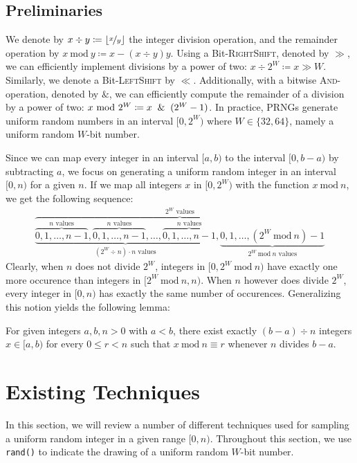 \documentclass[a4paper, UKenglish, cleveref, autoref, thm-restate]{lipics-v2021}
\newcommand{\Mod}[1]{\ \mathrm{mod}\ #1}
\begin{document}
\subsection{Preliminaries}\label{sec:1.2}
We denote by $x \div y \coloneqq \lfloor\nicefrac{x}{y}\rfloor$ the integer division operation, and the remainder operation by $x \Mod y \coloneqq x - (x \div y)y$. 
Using a Bit-\textsc{RightShift}, denoted by $\gg$, we can efficiently implement divisions by a power of two: $x \div 2^W \coloneqq x \gg W$.
Similarly, we denote a Bit-\textsc{LeftShift} by $\ll$.
Additionally, with a bitwise \textsc{And}-operation, denoted by $\&$, we can efficiently compute the remainder of a division by a power of two: $x \Mod 2^W \coloneqq x \And (2^W - 1)$.
In practice, PRNGs generate uniform random numbers in an interval $[0,2^W)$ where $W \in \{32,64\}$, namely a uniform random $W$-bit number.

Since we can map every integer in an interval $[a,b)$ to the interval $[0,b - a)$ by subtracting $a$, we focus on generating a uniform random integer in an interval $[0,n)$ for a given $n$.
If we map all integers $x$ in $[0,2^W)$ with the function $x \Mod n$, we get the following sequence:
{\large
\begin{align}\label{eq:1}
    \overbrace{\underbrace{\overbrace{0,1,\ldots,n - 1}^{\text{$n$ values}},\overbrace{0,1,\ldots,n - 1}^{\text{$n$ values}},\ldots,\overbrace{0,1,\ldots,n - 1}^{\text{$n$ values}}}_{\text{$\left(2^W \div n\right) \cdot n$ values}},\underbrace{0,1,\ldots,\left(2^W \Mod n\right) - 1}_{\text{$2^W \Mod n$ values}}}^{\text{$2^W$ values}}
\end{align}
}%
Clearly, when $n$ does not divide $2^W$, integers in $[0,2^W \Mod n)$ have exactly one more occurence than integers in $[2^W \Mod n, n)$.
When $n$ however does divide $2^W$, every integer in $[0,n)$ has exactly the same number of occurences.
Generalizing this notion yields the following lemma:
\begin{lemma} \label{lemma:1}
    For given integers $a,b,n > 0$ with $a < b$, there exist exactly $(b - a) \div n$ integers $x \in [a,b)$ for every $0 \leq r < n$ such that $x \Mod n \equiv r$ whenever $n$ divides $b - a$.
\end{lemma}




\section{Existing Techniques}\label{sec:2}
In this section, we will review a number of different techniques used for sampling a uniform random integer in a given range $[0,n)$.
Throughout this section, we use \texttt{rand()} to indicate the drawing of a uniform random $W$-bit number.
\end{document}

